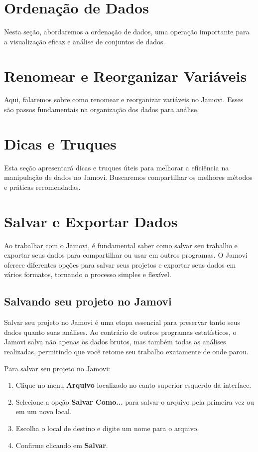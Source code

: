 \section{Ordenação de Dados}
Nesta seção, abordaremos a ordenação de dados, uma operação importante para a visualização eficaz e análise de conjuntos de dados.

\section{Renomear e Reorganizar Variáveis}
Aqui, falaremos sobre como renomear e reorganizar variáveis no Jamovi. Esses são passos fundamentais na organização dos dados para análise.

\section{Dicas e Truques}
Esta seção apresentará dicas e truques úteis para melhorar a eficiência na manipulação de dados no Jamovi. Buscaremos compartilhar os melhores métodos e práticas recomendadas.

\section{Salvar e Exportar Dados}

Ao trabalhar com o Jamovi, é fundamental saber como salvar seu trabalho e exportar seus dados para compartilhar ou usar em outros programas. O Jamovi oferece diferentes opções para salvar seus projetos e exportar seus dados em vários formatos, tornando o processo simples e flexível.

\subsection{Salvando seu projeto no Jamovi}

Salvar seu projeto no Jamovi é uma etapa essencial para preservar tanto seus dados quanto suas análises. Ao contrário de outros programas estatísticos, o Jamovi salva não apenas os dados brutos, mas também todas as análises realizadas, permitindo que você retome seu trabalho exatamente de onde parou.

Para salvar seu projeto no Jamovi:

\begin{enumerate}
    \item Clique no menu \textbf{Arquivo} localizado no canto superior esquerdo da interface.
    \item Selecione a opção \textbf{Salvar Como...} para salvar o arquivo pela primeira vez ou em um novo local.
    \item Escolha o local de destino e digite um nome para o arquivo.
    \item Confirme clicando em \textbf{Salvar}.
\end{enumerate}

